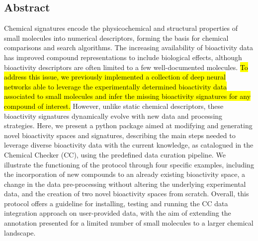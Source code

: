 \subsection{Abstract}

Chemical signatures encode the physicochemical and structural properties of small molecules into numerical descriptors, forming the basis for chemical comparisons and search algorithms. The increasing availability of bioactivity data has improved compound representations to include biological effects, although bioactivity descriptors are often limited to a few well-documented molecules. \hl{To address this issue, we previously implemented a collection of deep neural networks able to leverage the experimentally determined bioactivity data associated to small molecules and infer the missing bioactivity signatures for any compound of interest.} However, unlike static chemical descriptors, these bioactivity signatures dynamically evolve with new data and processing strategies. Here, we present a python package aimed at modifying and generating novel bioactivity spaces and signatures, describing the main steps needed to leverage diverse bioactivity data with the current knowledge, as catalogued in the Chemical Checker (CC), using the predefined data curation pipeline. We illustrate the functioning of the protocol through four specific examples, including the incorporation of new compounds to an already existing bioactivity space, a change in the data pre-processing without altering the underlying experimental data, and the creation of two novel bioactivity spaces from scratch. Overall, this protocol offers a guideline for installing, testing and running the CC data integration approach on user-provided data, with the aim of extending the annotation presented for a limited number of small molecules to a larger chemical landscape.
